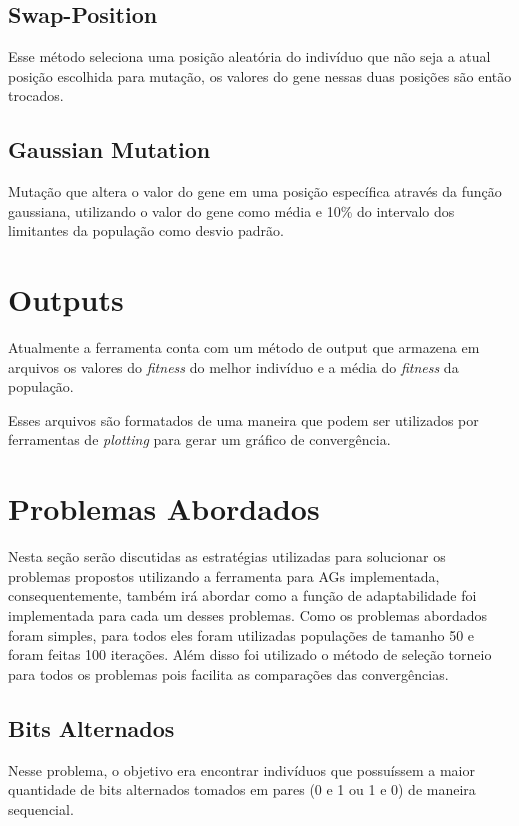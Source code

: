 \documentclass[12pt]{article}
\begin{document}
\subsection{Swap-Position}

Esse método seleciona uma posição aleatória do indivíduo que não seja a atual posição escolhida 
para mutação, os valores do gene nessas duas posições são então trocados.

\subsection{Gaussian Mutation}

Mutação que altera o valor do gene em uma posição específica através da função gaussiana, utilizando o 
valor do gene como média e 10\% do intervalo dos limitantes da população como desvio padrão.

\section{Outputs}

Atualmente a ferramenta conta com um método de output que armazena em arquivos os valores do \textit{fitness}
do melhor indivíduo e a média do \textit{fitness} da população. 

Esses arquivos são formatados de uma maneira que podem ser utilizados por ferramentas de \textit{plotting}
para gerar um gráfico de convergência.

\section{Problemas Abordados}

Nesta seção serão discutidas as estratégias utilizadas para solucionar os problemas propostos utilizando 
a ferramenta para AGs implementada, consequentemente, também irá abordar como a função de adaptabilidade 
foi implementada para cada um desses problemas. Como os problemas abordados foram simples, para todos 
eles foram utilizadas populações de tamanho 50 e foram feitas 100 iterações. Além disso foi utilizado 
o método de seleção torneio para todos os problemas pois facilita as comparações das convergências.

\subsection{Bits Alternados}

Nesse problema, o objetivo era encontrar indivíduos que possuíssem a maior quantidade de bits alternados 
tomados em pares (0 e 1 ou 1 e 0) de maneira sequencial. 
\end{document}
